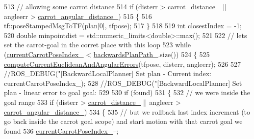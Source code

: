 \begin{DoxyCode}
513             \textcolor{comment}{// allowing some carrot distance}
514             \textcolor{keywordflow}{if} (disterr > \hyperlink{classcl__move__base__z_1_1backward__local__planner_1_1BackwardLocalPlanner_a0bbb80ce5bae865c4322869422803296}{carrot\_distance\_} || angleerr > 
      \hyperlink{classcl__move__base__z_1_1backward__local__planner_1_1BackwardLocalPlanner_a63e30befa09c4a67cf55086923b760c7}{carrot\_angular\_distance\_})
515             \{
516                 tf::poseStampedMsgToTF(plan[0], tfpose);
517             \}
518 
519             \textcolor{keywordtype}{int} closestIndex = -1;
520             \textcolor{keywordtype}{double} minpointdist = std::numeric\_limits<double>::max();
521 
522             \textcolor{comment}{// lets set the carrot-goal in the corret place with this loop}
523             \textcolor{keywordflow}{while} (\hyperlink{classcl__move__base__z_1_1backward__local__planner_1_1BackwardLocalPlanner_a2e8f2b78bc97f27c5fa431f3af2261ed}{currentCarrotPoseIndex\_} < 
      \hyperlink{classcl__move__base__z_1_1backward__local__planner_1_1BackwardLocalPlanner_ad9cde5c85f782cab2ddb4030e3c3f2cf}{backwardsPlanPath\_}.size())
524             \{
525                 \hyperlink{classcl__move__base__z_1_1backward__local__planner_1_1BackwardLocalPlanner_a843f030138afe0a28cf11a729fa67383}{computeCurrentEuclideanAndAngularErrors}(tfpose, 
      disterr, angleerr);
526 
527                 \textcolor{comment}{//ROS\_DEBUG("[BackwardLocalPlanner] Set plan - Current index: %
       currentCarrotPoseIndex\_);}
528                 \textcolor{comment}{//ROS\_DEBUG("[BackwardLocalPlanner] Set plan - linear error to goal %
       goal: %
529 
530                 \textcolor{keywordflow}{if} (found)
531                 \{
532                     \textcolor{comment}{// we were inside the goal range}
533                     \textcolor{keywordflow}{if} (disterr > \hyperlink{classcl__move__base__z_1_1backward__local__planner_1_1BackwardLocalPlanner_a0bbb80ce5bae865c4322869422803296}{carrot\_distance\_} || angleerr > 
      \hyperlink{classcl__move__base__z_1_1backward__local__planner_1_1BackwardLocalPlanner_a63e30befa09c4a67cf55086923b760c7}{carrot\_angular\_distance\_})
534                     \{
535                         \textcolor{comment}{// but we rollback last index increment (to go back inside the carrot goal scope)
       and start motion with that carrot goal we found}
536                         \hyperlink{classcl__move__base__z_1_1backward__local__planner_1_1BackwardLocalPlanner_a2e8f2b78bc97f27c5fa431f3af2261ed}{currentCarrotPoseIndex\_}--;
}
\end{DoxyCode}
